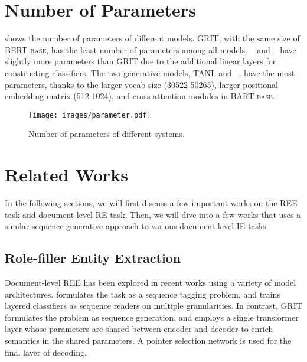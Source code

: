 \documentclass[11pt]{article}
\begin{document}
\section{Number of Parameters}
 shows the number of parameters of different models. GRIT, with the same size of \textsc{BERT-base}, has the least number of parameters among all models. \dygiepp~ and \scirexpipeline~ have slightly more parameters than GRIT due to the additional linear layers for constructing classifiers. The two generative models, TANL and \modelshort~, have the most parameters, thanks to the larger vocab size (30522  50265), larger positional embedding matrix (512  1024), and cross-attention modules in \textsc{BART-base}.
\begin{figure}[h]
    \centering
    \texttt{[image: images/parameter.pdf]}
    \caption{Number of parameters of different systems.}
    \vspace{-4mm}
    \label{fig:parameters}
\end{figure}
















%
 \section{Related Works}
In the following sections, we will first discuss a few important works on the REE task and document-level RE task. Then, we will dive into a few works that uses a similar sequence generative approach to various document-level IE tasks.



\subsection{Role-filler Entity Extraction}
Document-level REE has been explored in recent works using a variety of model architectures. \citet{du2020document} formulates the task as a sequence tagging problem, and trains layered classifiers as sequence readers on multiple granularities. In contrast, GRIT \cite{du-2020-grit} formulates the problem as sequence generation, and employs a single transformer layer whose parameters are shared between encoder and decoder to enrich semantics in the shared parameters. A pointer selection network is used for the final layer of decoding. 
\end{document}
